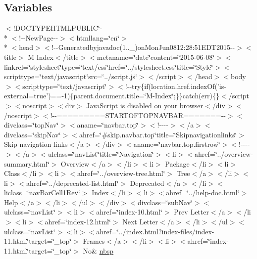 \subsection*{Variables}
\begin{DoxyCompactItemize}
\item 
$<$!D\-O\-C\-T\-Y\-P\-E\-H\-T\-M\-L\-P\-U\-B\-L\-I\-C\char`\"{}-\/\\*
$<$!-\/-\/New\-Page-\/-\/$>$$<$htmllang=\char`\"{}en\char`\"{}$>$\\*
$<$head$>$$<$!-\/-\/Generatedbyjavadoc(1..\-\_)on\-Mon\-Jun0812\-:28\-:51\-E\-D\-T2015-\/-\/$>$$<$title$>$ M Index$<$/title$>$$<$metaname=\char`\"{}date\char`\"{}content=\char`\"{}2015-\/06-\/08\char`\"{}$>$$<$linkrel=\char`\"{}stylesheet\char`\"{}type=\char`\"{}text/css\char`\"{}href=\char`\"{}../stylesheet.\-css\char`\"{}title=\char`\"{}\-Style\char`\"{}$>$$<$scripttype=\char`\"{}text/javascript\char`\"{}src=\char`\"{}../script.\-js\char`\"{}$>$$<$/script$>$$<$/head$>$$<$body$>$$<$scripttype=\char`\"{}text/javascript\char`\"{}$>$$<$!-\/-\/try\{if(location.\-href.\-index\-Of('is-\/external=true')==-\/1)\{parent.\-document.\-title=\char`\"{}\-M-\/\-Index\char`\"{};\}\}catch(err)\{\}$<$/script$>$$<$noscript$>$$<$div$>$ Java\-Script is disabled on your browser$<$/div$>$$<$/noscript$>$$<$!-\/-\/=========\-S\-T\-A\-R\-T\-O\-F\-T\-O\-P\-N\-A\-V\-B\-A\-R=======-\/-\/$>$$<$divclass=\char`\"{}top\-Nav\char`\"{}$>$$<$aname=\char`\"{}navbar.\-top\char`\"{}$>$$<$!-\/-\/-\/-\/$>$$<$/a$>$$<$divclass=\char`\"{}skip\-Nav\char`\"{}$>$$<$ahref=\char`\"{}\#skip.\-navbar.\-top\char`\"{}title=\char`\"{}\-Skipnavigationlinks\char`\"{}$>$ Skip navigation links$<$/a$>$$<$/div$>$$<$aname=\char`\"{}navbar.\-top.\-firstrow\char`\"{}$>$$<$!-\/-\/-\/-\/$>$$<$/a$>$$<$ulclass=\char`\"{}nav\-List\char`\"{}title=\char`\"{}\-Navigation\char`\"{}$>$$<$li$>$$<$ahref=\char`\"{}../overview-\/summary.\-html\char`\"{}$>$ Overview$<$/a$>$$<$/li$>$$<$li$>$ Package$<$/li$>$$<$li$>$ Class$<$/li$>$$<$li$>$$<$ahref=\char`\"{}../overview-\/tree.\-html\char`\"{}$>$ Tree$<$/a$>$$<$/li$>$$<$li$>$$<$ahref=\char`\"{}../deprecated-\/list.\-html\char`\"{}$>$ Deprecated$<$/a$>$$<$/li$>$$<$liclass=\char`\"{}nav\-Bar\-Cell1\-Rev\char`\"{}$>$ Index$<$/li$>$$<$li$>$$<$ahref=\char`\"{}../help-\/doc.\-html\char`\"{}$>$ Help$<$/a$>$$<$/li$>$$<$/ul$>$$<$/div$>$$<$divclass=\char`\"{}sub\-Nav\char`\"{}$>$$<$ulclass=\char`\"{}nav\-List\char`\"{}$>$$<$li$>$$<$ahref=\char`\"{}index-\/10.\-html\char`\"{}$>$ Prev Letter$<$/a$>$$<$/li$>$$<$li$>$$<$ahref=\char`\"{}index-\/12.\-html\char`\"{}$>$ Next Letter$<$/a$>$$<$/li$>$$<$/ul$>$$<$ulclass=\char`\"{}nav\-List\char`\"{}$>$$<$li$>$$<$ahref=\char`\"{}../index.\-html?index-\/files/index-\/11.\-html\char`\"{}target=\char`\"{}\-\_\-top\char`\"{}$>$ Frames$<$/a$>$$<$/li$>$$<$li$>$$<$ahref=\char`\"{}index-\/11.\-html\char`\"{}target=\char`\"{}\-\_\-top\char`\"{}$>$ No\& \hyperlink{index-11_8html_a479d00f21dbca369efe3be97f1ef785a}{nbsp}

\end{DoxyCompactItemize}
